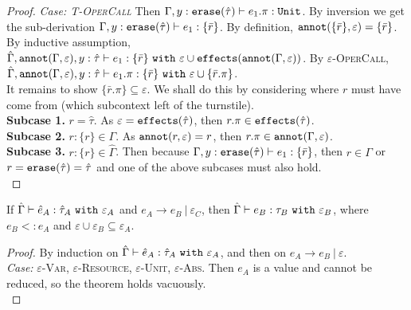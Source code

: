 \begin{appendix}
\begin{proof}
\noindent
\textit{Case: \textsc{T-OperCall}} Then $\Gamma, y: \mathtt{erase}(\hat \tau) \vdash e_1.\pi : \mathtt{Unit}$. By inversion we get the sub-derivation $\Gamma, y: \mathtt{erase}(\hat \tau) \vdash e_1: \{ \bar r \}$. By definition, $\mathtt{annot}(\{ \bar r \}, \varepsilon) = \{ \bar r \}$. By inductive assumption, $\hat \Gamma, \mathtt{annot}(\Gamma, \varepsilon), y: \hat \tau \vdash e_1: \{ \bar r \} ~\mathtt{with}~ \varepsilon \cup \mathtt{effects}(\mathtt{annot}(\Gamma, \varepsilon))$. By \textsc{$\varepsilon$-OperCall}, $\hat \Gamma, \mathtt{annot}(\Gamma, \varepsilon), y: \hat \tau \vdash e_1.\pi: \{ \bar r \} ~\mathtt{with}~ \varepsilon \cup \{ \bar r.\pi \}$. \\

It remains to show $\{ \bar r.\pi \} \subseteq \varepsilon$. We shall do this by considering where $r$ must have come from (which subcontext left of the turnstile).  \\

\textbf{Subcase 1.} $r = \hat \tau$. As $\varepsilon = \mathtt{effects}(\hat \tau)$, then $r.\pi \in \mathtt{effects}(\hat \tau)$. \\

\textbf{Subcase 2.} $r: \{ r \} \in \Gamma$. As $\mathtt{annot}(r, \varepsilon) = r$, then $r.\pi \in \mathtt{annot}(\Gamma, \varepsilon)$. \\

\textbf{Subcase 3.} $r: \{ r \} \in \hat \Gamma$. Then because $\Gamma, y: \mathtt{erase}(\hat \tau) \vdash e_1: \{ \bar r \}$, then $r \in \Gamma$ or $r = \mathtt{erase}(\hat \tau) = \hat \tau$ and one of the above subcases must also hold. \\

\end{proof}

\hrulefill

\begin{theorem}[Preservation]
If $\hat \Gamma \vdash \hat e_A: \hat \tau_A~\mathtt{with}~ \varepsilon_A$ and $e_A \longrightarrow e_B~|~\varepsilon_C$, then $\hat \Gamma \vdash e_B: \tau_B~\mathtt{with}~ \varepsilon_B$, where $e_B <: e_A$ and $\varepsilon \cup \varepsilon_B \subseteq \varepsilon_A$.
\end{theorem}

\begin{proof}
By induction on $\hat \Gamma \vdash \hat e_A: \hat \tau_A~\mathtt{with}~ \varepsilon_A$, and then on $e_A \longrightarrow e_B~|~\varepsilon$. \\

\textit{Case:} \textsc{$\varepsilon$-Var}, \textsc{$\varepsilon$-Resource}, \textsc{$\varepsilon$-Unit}, \textsc{$\varepsilon$-Abs}. Then $e_A$ is a value and cannot be reduced, so the theorem holds vacuously. \\


\end{proof}
\end{appendix}
